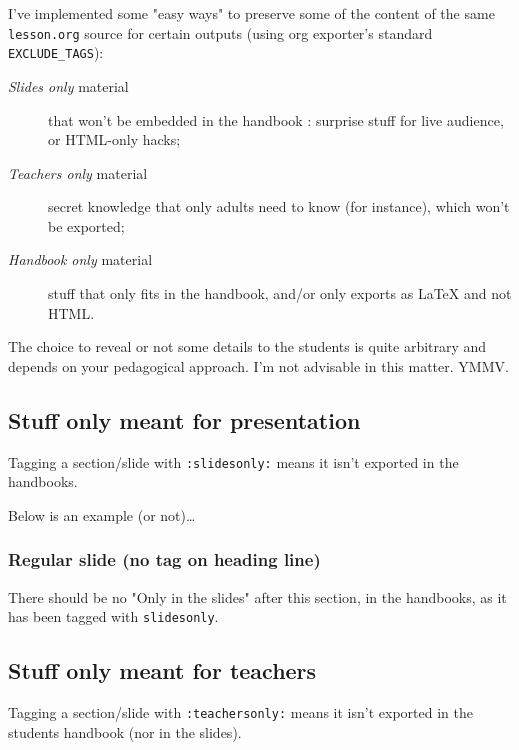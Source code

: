 \documentclass[a4paper]{article}
\begin{document}
I've implemented some "easy ways" to preserve some of the content of the same \texttt{lesson.org} source for certain outputs (using org exporter's standard \texttt{EXCLUDE\_TAGS}):

\begin{description}
\item[{\emph{Slides only} material}] that won't be embedded in the handbook : surprise stuff for live audience, or HTML-only hacks;
\item[{\emph{Teachers only} material}] secret knowledge that only adults need
to know (for instance), which won't be exported;
\end{description}
\begin{description}
\item[{\emph{Handbook only} material}] stuff that only fits in the handbook, and/or only exports as \LaTeX{} and not HTML.
\end{description}

\begin{NOTES}
The choice to reveal or not some details to the students is quite arbitrary and depends on your pedagogical approach. I'm not advisable in this matter. YMMV.
\end{NOTES}

\subsection{Stuff only meant for presentation}
\label{sec:orgad0ac37}

Tagging a section/slide with \texttt{:slidesonly:} means it isn't exported in the handbooks.

Below is an example (or not)\ldots{}

\subsubsection{Regular slide (no tag on heading line)}
\label{sec:org98ef9ac}

There should be no "Only in the slides" after this section, in the
handbooks, as it has been tagged with \texttt{slidesonly}.

\subsection{Stuff only meant for teachers}
\label{sec:org91df24d}

Tagging a section/slide with \texttt{:teachersonly:} means it isn't exported in the students handbook (nor in the slides).
\end{document}
